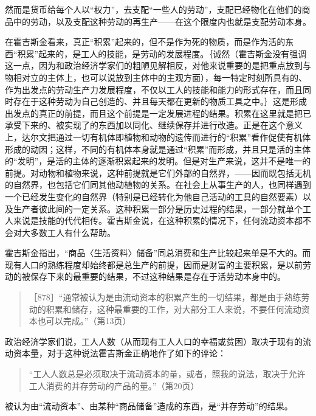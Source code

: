 然而是货币给每个人以“权力”，去支配“一些人的劳动”，支配已经物化在他们的商品中的劳动，以及支配这种劳动的再生产——在这个限度内也就是支配劳动本身。

在霍吉斯金看来，真正“积累”起来的，但不是作为死的物质，而是作为活的东西“积累”起来的，是工人的技能，是劳动的发展程度。｛诚然（霍吉斯金没有强调这一点，因为和政治经济学家们的粗陋见解相反，对他来说重要的是把重点放到与物相对立的主体上，也可以说放到主体中的主观方面），每一特定时刻所具有的、作为出发点的劳动生产力发展程度，不仅以工人的技能和能力的形式存在，而且同时存在于这种劳动为自己创造的、并且每天都在更新的物质工具之中。｝这是形成出发点的真正的前提，而且这个前提是一定发展进程的结果。积累在这里就是把已承受下来的、被实现了的东西加以同化、继续保存并进行改造。正是在这个意义上，达尔文把通过一切有机体即植物和动物的遗传而进行的“积累”看作促使有机体形成的动因；这样，不同的有机体本身就是通过“积累”而形成，并且只是活的主体的“发明”，是活的主体的逐渐积累起来的发明。但是对生产来说，这并不是唯一的前提。对动物和植物来说，这种前提就是它们外部的自然界，——因而既包括无机的自然界，也包括它们同其他动植物的关系。在社会上从事生产的人，也同样遇到一个已经发生变化的自然界（特别是已经转化为他自己活动的工具的自然要素）以及生产者彼此间的一定关系。这种积累一部分是历史过程的结果，一部分就单个工人来说是技能的代代相传。霍吉斯金说，在这种积累的情况下，任何流动资本都不会对大多数工人有什么帮助。

霍吉斯金指出，“商品〈生活资料〉储备”同总消费和生产比较起来单是不大的。而现有人口的熟练程度却始终都是总生产的前提，因而是财富的主要积累，是以前劳动的被保存下来的最重要的结果，不过这种结果是存在于活劳动本身中的。

\begin{quote}{［878］“通常被认为是由流动资本的积累产生的一切结果，都是由于熟练劳动的积累和储存，这种最重要的工作，对大部分工人来说，不要任何流动资本也可以完成。”（第13页）}\end{quote}

政治经济学家们说，工人人数（从而现有工人人口的幸福或贫困）取决于现有的流动资本量，对于这种说法霍吉斯金正确地作了如下的评论：

\begin{quote}{“工人人数总是必须取决于流动资本的量，或者，照我的说法，取决于允许工人消费的并存劳动的产品的量。”（第20页）}\end{quote}

被认为由“流动资本”、由某种“商品储备”造成的东西，是“并存劳动”的结果。

